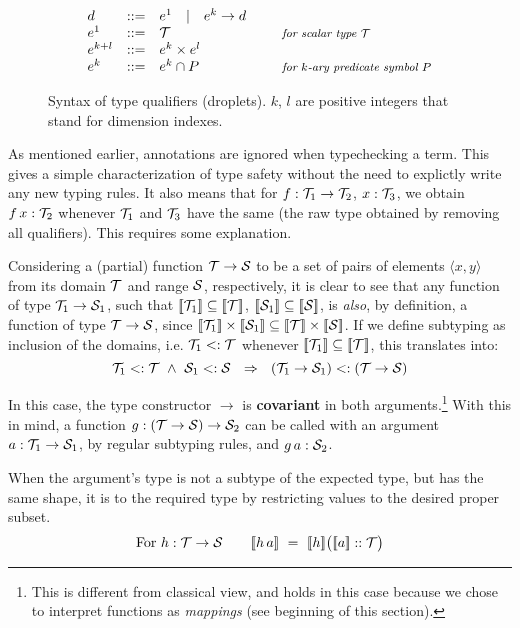 \begin{figure}
\[
\begin{array}{lcll}
  d       & ::= & e^1 \quad |\quad e^k\to d \\
  e^1     & ::= & \T & \mbox{\it\small for scalar type $\T$} \\
  e^{k+l} & ::= & e^k \times e^l \\
  e^k     & ::= & e^k \cap P & \mbox{\it\small for $k$-ary predicate symbol $P$} 
\end{array}
\]
\vspace{-.5em}
\caption{\label{lang:droplets}
  Syntax of type qualifiers (droplets). $k$, $l$ are positive integers
  that stand for dimension indexes.}
\end{figure}

As mentioned earlier, annotations are ignored when typechecking a term.
This gives a simple characterization of type safety without the need to
explictly write any new typing rules. It also means that for $f:\T_1\to\T_2$, $x:\T_3$, we obtain $f\,x:\T_2$ whenever
$\T_1$ and $\T_3$ have the same  (the raw type obtained by removing all qualifiers).
This requires some explanation.

Considering a (partial) function $\T\to\S$ to be a set of pairs of elements $\langle x,y\rangle$ 
from its domain $\T$ and range $\S$, respectively, it is clear to see that any function of type $\T_1\to\S_1$,
such that $\semp{\T_1}\subseteq\semp{\T}$, $\semp{\S_1}\subseteq\semp{\S}$, 
is \emph{also}, by definition, a function of type $\T\to\S$, since $\semp{\T_1}\times\semp{\S_1}\subseteq\semp{\T}\times\semp{\S}$.
If we define subtyping as inclusion of the domains, i.e. $\T_1 <:\T$ whenever $\semp{\T_1}\subseteq\semp{\T}$,
this translates into:
%
\[\T_1<:\T ~\land~ \S_1<:\S ~~\Rightarrow~~ (\T_1\to\S_1) <: (\T\to\S)\]

In this case, the type constructor $\to$ is {\bf covariant} in both arguments.\footnote{This is different from classical view, and holds in this case because we chose to interpret functions as \emph{mappings} (see beginning of this section).}
With this in mind, a function $g:(\T\to\S)\to \S_2$ can be called with an argument $a: \T_1\to\S_1$,
by regular subtyping rules, and $g\,a : \S_2$.

When the argument's type is not a subtype of the expected type, but has the same shape,
it is  to the required type by restricting values to the desired proper subset.
%
\[\mbox{For }h:\T\to\S \qquad \semp{h\,a} ~=~ \semp{h}\big(\semp{a} :: \T\big)\]

